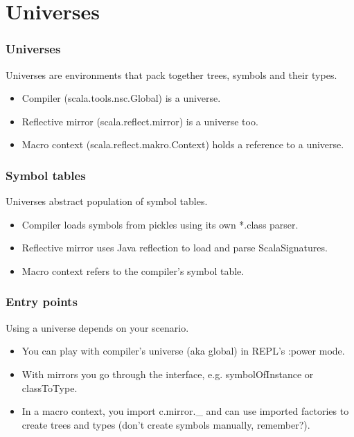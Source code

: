 \documentclass[hyperref={bookmarks=false}]{beamer}
\begin{document}
\section{Universes}

\begin{frame}[fragile]
\frametitle{Universes}

Universes are environments that pack together trees, symbols and their types.

\begin{itemize}
\item Compiler (scala.tools.nsc.Global) is a universe.
\item Reflective mirror (scala.reflect.mirror) is a universe too.
\item Macro context (scala.reflect.makro.Context) holds a reference to a universe.
\end{itemize}
\end{frame}

\begin{frame}[fragile]
\frametitle{Symbol tables}

Universes abstract population of symbol tables.

\begin{itemize}
\item Compiler loads symbols from pickles using its own *.class parser.
\item Reflective mirror uses Java reflection to load and parse ScalaSignatures.
\item Macro context refers to the compiler's symbol table.
\end{itemize}
\end{frame}

\begin{frame}[fragile]
\frametitle{Entry points}

Using a universe depends on your scenario.

\begin{itemize}
\item You can play with compiler's universe (aka global) in REPL's :power mode.
\item With mirrors you go through the 
interface, e.g. symbolOfInstance or classToType.
\item In a macro context, you import c.mirror.\_ and can use imported factories to create trees and types (don't create symbols manually, remember?).
\end{itemize}
\end{frame}
\end{document}
